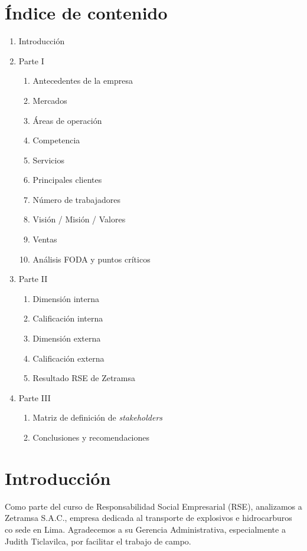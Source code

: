 \documentclass[a4paber,12pt]{article}
\begin{document}
	\section*{Índice de contenido}
	\begin{enumerate}
		\item Introducción
		\item Parte I
		\begin{enumerate}
			\item Antecedentes de la empresa
			\item Mercados
			\item Áreas de operación
			\item Competencia
			\item Servicios
			\item Principales clientes
			\item Número de trabajadores
			\item Visión / Misión / Valores
			\item Ventas
			\item Análisis FODA y puntos críticos
		\end{enumerate}
		\item Parte II
		\begin{enumerate}
			\item Dimensión interna
			\item Calificación interna
			\item Dimensión externa
			\item Calificación externa
			\item Resultado RSE de Zetramsa
		\end{enumerate}
		\item Parte III
		\begin{enumerate}
			\item Matriz de definición de \textit{stakeholders}
			\item Conclusiones y recomendaciones
		\end{enumerate}
	\end{enumerate}
	
	\newpage
	
	\section{Introducción}
	Como parte del curso de Responsabilidad Social Empresarial (RSE), analizamos a Zetramsa S.A.C., empresa dedicada al transporte de explosivos e hidrocarburos co sede en Lima. Agradecemos a su Gerencia Administrativa, especialmente a Judith Ticlavilca, por facilitar el trabajo de campo.
	
\end{document}

